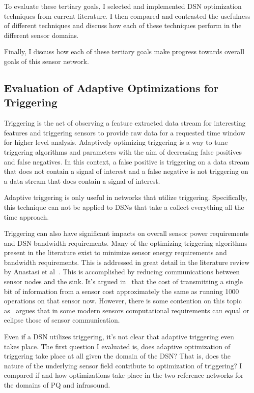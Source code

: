 To evaluate these tertiary goals, I selected and implemented DSN optimization techniques from current literature. I then compared and contrasted the usefulness of different techniques and discuss how each of these techniques perform in the different sensor domains.

Finally, I discuss how each of these tertiary goals make progress towards overall goals of this sensor network.

\subsection{Evaluation of Adaptive Optimizations for Triggering}\label{subsec:evaluation-of-adaptive-optimizations-for-triggering}
Triggering is the act of observing a feature extracted data stream for interesting features and triggering sensors to provide raw data for a requested time window for higher level analysis. Adaptively optimizing triggering is a way to tune triggering algorithms and parameters with the aim of decreasing false positives and false negatives. In this context, a false positive is triggering on a data stream that does not contain a signal of interest and a false negative is not triggering on a data stream that does contain a signal of interest.

Adaptive triggering is only useful in networks that utilize triggering. Specifically, this technique can not be applied to DSNs that take a collect everything all the time approach.

Triggering can also have significant impacts on overall sensor power requirements and DSN bandwidth requirements. Many of the optimizing triggering algorithms present in the literature exist to minimize sensor energy requirements and bandwidth requirements. This is addressed in great detail in the literature review by Anastasi et al~\cite{anastasi_energy_2009}. This is accomplished by reducing communications between sensor nodes and the sink. It's argued in~\cite{pottie2000wireless} that the cost of transmitting a single bit of information from a sensor cost approximately the same as running 1000 operations on that sensor now. However, there is some contention on this topic as~\cite{alippi_adaptive_2010} argues that in some modern sensors computational requirements can equal or eclipse those of  sensor communication.

Even if a DSN utilizes triggering, it's not clear that adaptive triggering even takes place. The first question I evaluated is, does adaptive optimization of triggering take place at all given the domain of the DSN? That is, does the nature of the underlying sensor field contribute to optimization of triggering? I compared if and how optimizations take place in the two reference networks for the domains of PQ and infrasound.

